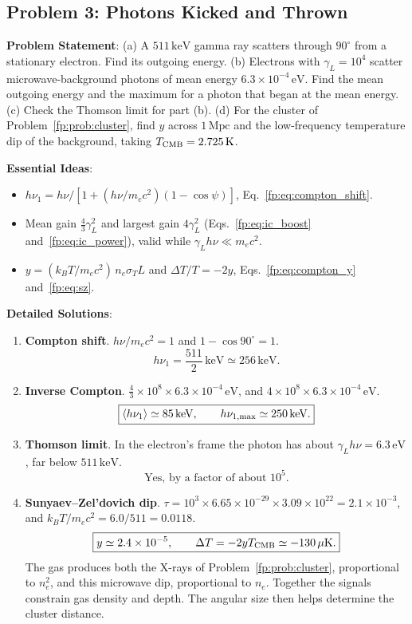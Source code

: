 \subsection{Problem 3: Photons Kicked and Thrown}
\label{fp:prob:compton}

\textbf{Problem Statement}: (a) A $511\,\mathrm{keV}$ gamma ray scatters through $90^\circ$ from a stationary electron. Find its outgoing energy. (b) Electrons with $\gamma_L=10^4$ scatter microwave-background photons of mean energy $6.3\times10^{-4}\,\mathrm{eV}$. Find the mean outgoing energy and the maximum for a photon that began at the mean energy. (c) Check the Thomson limit for part (b). (d) For the cluster of Problem~\ref{fp:prob:cluster}, find $y$ across $1\,\mathrm{Mpc}$ and the low-frequency temperature dip of the background, taking $T_{\rm CMB}=2.725\,\mathrm K$.

\textbf{Essential Ideas}:
\begin{itemize}
	\item $h\nu_1=h\nu/[1+(h\nu/m_ec^2)(1-\cos\psi)]$, Eq.~\eqref{fp:eq:compton_shift}.
	\item Mean gain $\tfrac43\gamma_L^2$ and largest gain $4\gamma_L^2$ (Eqs.~\eqref{fp:eq:ic_boost} and~\eqref{fp:eq:ic_power}), valid while $\gamma_Lh\nu\ll m_ec^2$.
	\item $y=(k_BT/m_ec^2)\,n_e\sigma_TL$ and $\Delta T/T=-2y$, Eqs.~\eqref{fp:eq:compton_y} and~\eqref{fp:eq:sz}.
\end{itemize}

\textbf{Detailed Solutions}:
\begin{enumerate}[label=(\alph*)]
	\item \textbf{Compton shift}. $h\nu/m_ec^2=1$ and $1-\cos90^\circ=1$.
	\[
	\boxed{h\nu_1=\frac{511}{2}\,\mathrm{keV}\simeq256\,\mathrm{keV}.}
	\]
	\item \textbf{Inverse Compton}. $\tfrac43\times10^8\times6.3\times10^{-4}\,\mathrm{eV}$, and $4\times10^8\times6.3\times10^{-4}\,\mathrm{eV}$.
	\[
	\boxed{\left\langle h\nu_1\right\rangle\simeq85\,\mathrm{keV},\qquad h\nu_{1,\max}\simeq250\,\mathrm{keV}.}
	\]
	\item \textbf{Thomson limit}. In the electron's frame the photon has about $\gamma_Lh\nu=6.3\,\mathrm{eV}$, far below $511\,\mathrm{keV}$.
	\[
	\boxed{\text{Yes, by a factor of about }10^5.}
	\]
	\item \textbf{Sunyaev–Zel'dovich dip}. $\tau=10^3\times6.65\times10^{-29}\times3.09\times10^{22}=2.1\times10^{-3}$, and $k_BT/m_ec^2=6.0/511=0.0118$.
	\[
	\boxed{y\simeq2.4\times10^{-5},\qquad \Delta T=-2yT_{\rm CMB}\simeq-130\,\mu\mathrm K.}
	\]
	The gas produces both the X-rays of Problem~\ref{fp:prob:cluster}, proportional to $n_e^2$, and this microwave dip, proportional to $n_e$. Together the signals constrain gas density and depth. The angular size then helps determine the cluster distance.
\end{enumerate}

